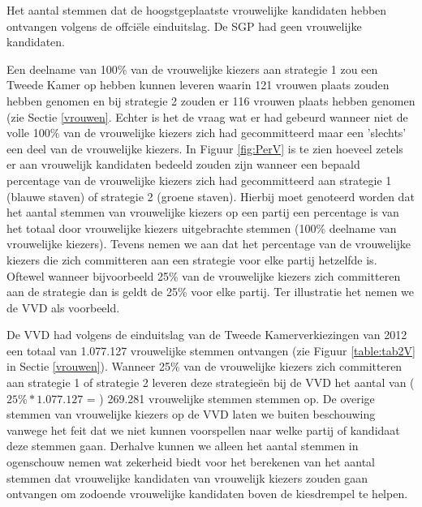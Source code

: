 \begin{table}[H]
\centering
	\begin{footnotesize}
		
	\end{footnotesize}
			\caption{Het aantal stemmen dat de hoogstgeplaatste vrouwelijke kandidaten hebben ontvangen volgens de offci\"{e}le einduitslag. De SGP had geen vrouwelijke kandidaten.}
\label{table:HoogstV} 
\end{table} 

\indent Een deelname van 100\% van de vrouwelijke kiezers aan strategie 1 zou een Tweede Kamer op hebben kunnen leveren waarin 121 vrouwen plaats zouden hebben genomen en bij strategie 2 zouden er 116 vrouwen plaats hebben genomen (zie Sectie \ref{vrouwen}. Echter is het de vraag wat er had gebeurd wanneer niet de volle 100\% van de vrouwelijke kiezers zich had gecommitteerd maar een 'slechts' een deel van de vrouwelijke kiezers. In Figuur \ref{fig:PerV} is te zien hoeveel zetels er aan vrouwelijk kandidaten bedeeld zouden zijn wanneer een bepaald percentage van de vrouwelijke kiezers zich had gecommitteerd aan strategie 1 (blauwe staven) of strategie 2 (groene staven). Hierbij moet genoteerd worden dat het aantal stemmen van vrouwelijke kiezers op een partij een percentage is van het totaal door vrouwelijke kiezers uitgebrachte stemmen (100\% deelname van vrouwelijke kiezers). Tevens nemen we aan dat het percentage van de vrouwelijke kiezers die zich committeren aan een strategie voor elke partij hetzelfde is. Oftewel wanneer bijvoorbeeld 25\% van de vrouwelijke kiezers zich committeren aan de strategie dan is geldt de 25\% voor elke partij. Ter illustratie het nemen we de VVD als voorbeeld.

De VVD had volgens de einduitslag van de Tweede Kamerverkiezingen van 2012 een totaal van 1.077.127 vrouwelijke stemmen ontvangen (zie Figuur \ref{table:tab2V} in Sectie \ref{vrouwen}). Wanneer 25\% van de vrouwelijke kiezers zich committeren aan strategie 1 of strategie 2 leveren deze strategie\"{e}n bij de VVD het aantal van ($25\%*1.077.127$ = ) 269.281 vrouwelijke stemmen stemmen op. De overige stemmen van vrouwelijke kiezers op de VVD laten we buiten beschouwing vanwege het feit dat we niet kunnen voorspellen naar welke partij of kandidaat deze stemmen gaan. Derhalve kunnen we alleen het aantal stemmen in ogenschouw nemen wat zekerheid biedt voor het berekenen van het aantal stemmen dat vrouwelijke kandidaten van vrouwelijk kiezers zouden gaan ontvangen om zodoende vrouwelijke kandidaten boven de kiesdrempel te helpen.  

